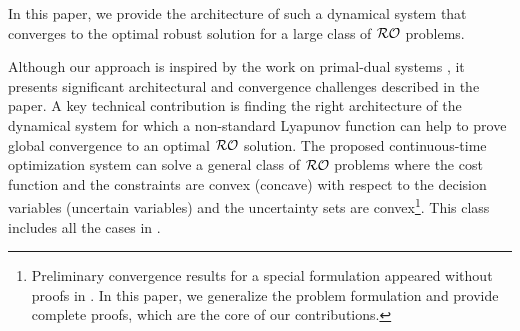 \documentclass[journal,twoside,web]{ieeecolor}
\begin{document}
In this paper, we provide the architecture of such a dynamical system that converges to the optimal robust solution for a large class of ${\cal RO}$ problems.

Although our approach is inspired by the work on primal-dual systems \cite{arrow1958,feijer2010}, it presents significant architectural and convergence challenges described in the paper. A key technical contribution is finding the right architecture of the dynamical system for which a non-standard Lyapunov function can help to prove global convergence to an optimal ${\cal RO}$ solution. The proposed continuous-time optimization system can solve a general class of ${\cal RO}$ problems where the cost function and the constraints are convex (concave) with respect to the decision variables (uncertain variables) and the uncertainty sets are convex\footnote{Preliminary convergence results for a special formulation appeared without proofs in \cite{ebrahimi2019continuous}. In this paper, we generalize the problem formulation and provide complete proofs, which are the core of our contributions.}. This class includes all the cases in \cite[~Table 1]{gorissen20152}. 

\end{document}
